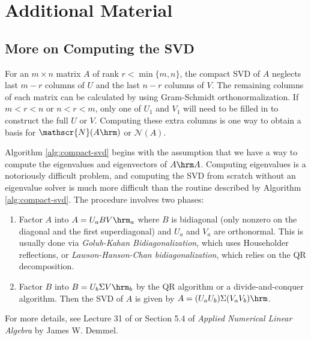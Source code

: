
\newpage

\section*{Additional Material} %

\subsection*{More on Computing the SVD} %

For an $m\times n$ matrix $A$ of rank $r < \min\{m,n\}$, the compact SVD of $A$ neglects last $m-r$ columns of $U$ and the last $n-r$ columns of $V$.
The remaining columns of each matrix can be calculated by using Gram-Schmidt orthonormalization.
If $m < r < n$ or $n < r < m$, only one of $U_1$ and $V_1$ will need to be filled in to construct the full $U$ or $V$.
Computing these extra columns is one way to obtain a basis for $\mathscr{N}(A\hrm)$ or $\mathscr{N}(A)$.

Algorithm \ref{alg:compact-svd} begins with the assumption that we have a way to compute the eigenvalues and eigenvectors of $A\hrm A$.
Computing eigenvalues is a notoriously difficult problem, and computing the SVD from scratch without an eigenvalue solver is much more difficult than the routine described by Algorithm \ref{alg:compact-svd}.
The procedure involves two phases:
\begin{enumerate}
    \item Factor $A$ into $A = U_a B V\hrm_a$ where $B$ is bidiagonal (only nonzero on the diagonal and the first superdiagonal) and $U_a$ and $V_a$ are orthonormal.
    This is usually done via \emph{Golub-Kahan Bidiagonalization}, which uses Householder reflections, or \emph{Lawson-Hanson-Chan bidiagonalization}, which relies on the QR decomposition.
    \item Factor $B$ into $B = U_b \Sigma V\hrm_b$ by the QR algorithm or a divide-and-conquer algorithm.
    Then the SVD of $A$ is given by $A = (U_aU_b)\Sigma (V_aV_b)\hrm$.
\end{enumerate}
For more details, see Lecture 31 of \cite{Trefethen1997} or Section 5.4 of \emph{Applied Numerical Linear Algebra} by James W. Demmel.

